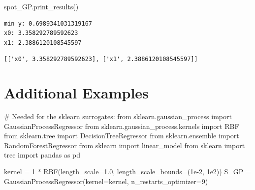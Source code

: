 \documentclass[
  letterpaper,
  DIV=11,
  numbers=noendperiod]{scrreprt}
\newenvironment{Shaded}{\begin{snugshade}}{\end{snugshade}}
\newcommand{\CommentTok}[1]{\textcolor[rgb]{0.37,0.37,0.37}{#1}}
\newcommand{\DecValTok}[1]{\textcolor[rgb]{0.68,0.00,0.00}{#1}}
\newcommand{\FloatTok}[1]{\textcolor[rgb]{0.68,0.00,0.00}{#1}}
\newcommand{\ImportTok}[1]{\textcolor[rgb]{0.00,0.46,0.62}{#1}}
\newcommand{\NormalTok}[1]{\textcolor[rgb]{0.00,0.23,0.31}{#1}}
\newcommand{\OperatorTok}[1]{\textcolor[rgb]{0.37,0.37,0.37}{#1}}
\begin{document}
\begin{Shaded}
\begin{Highlighting}[]
\NormalTok{spot\_GP.print\_results()}
\end{Highlighting}
\end{Shaded}

\begin{verbatim}
min y: 0.6989341031319167
x0: 3.358292789592623
x1: 2.3886120108545597
\end{verbatim}

\begin{verbatim}
[['x0', 3.358292789592623], ['x1', 2.3886120108545597]]
\end{verbatim}

\hypertarget{additional-examples}{%
\section{Additional Examples}\label{additional-examples}}

\begin{Shaded}
\begin{Highlighting}[]
\CommentTok{\# Needed for the sklearn surrogates:}
\ImportTok{from}\NormalTok{ sklearn.gaussian\_process }\ImportTok{import}\NormalTok{ GaussianProcessRegressor}
\ImportTok{from}\NormalTok{ sklearn.gaussian\_process.kernels }\ImportTok{import}\NormalTok{ RBF}
\ImportTok{from}\NormalTok{ sklearn.tree }\ImportTok{import}\NormalTok{ DecisionTreeRegressor}
\ImportTok{from}\NormalTok{ sklearn.ensemble }\ImportTok{import}\NormalTok{ RandomForestRegressor}
\ImportTok{from}\NormalTok{ sklearn }\ImportTok{import}\NormalTok{ linear\_model}
\ImportTok{from}\NormalTok{ sklearn }\ImportTok{import}\NormalTok{ tree}
\ImportTok{import}\NormalTok{ pandas }\ImportTok{as}\NormalTok{ pd}
\end{Highlighting}
\end{Shaded}

\begin{Shaded}
\begin{Highlighting}[]
\NormalTok{kernel }\OperatorTok{=} \DecValTok{1} \OperatorTok{*}\NormalTok{ RBF(length\_scale}\OperatorTok{=}\FloatTok{1.0}\NormalTok{, length\_scale\_bounds}\OperatorTok{=}\NormalTok{(}\FloatTok{1e{-}2}\NormalTok{, }\FloatTok{1e2}\NormalTok{))}
\NormalTok{S\_GP }\OperatorTok{=}\NormalTok{ GaussianProcessRegressor(kernel}\OperatorTok{=}\NormalTok{kernel, n\_restarts\_optimizer}\OperatorTok{=}\DecValTok{9}\NormalTok{)}
\end{Highlighting}
\end{Shaded}
\end{document}
